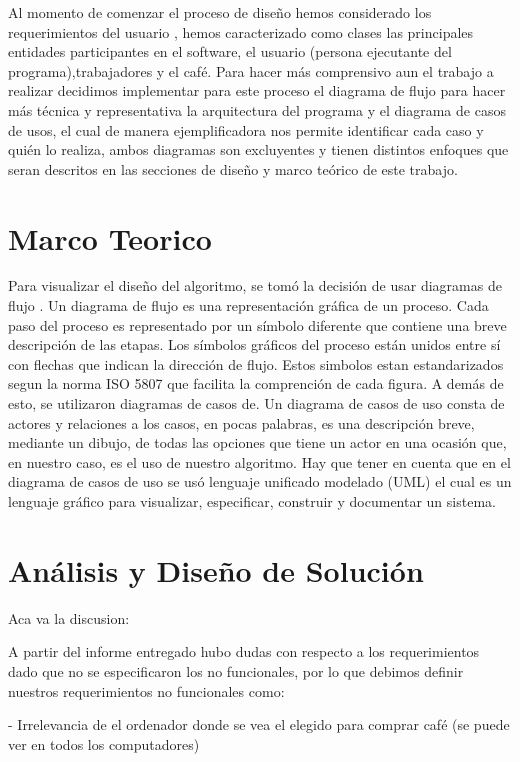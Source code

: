 \documentclass[twocolumn,11pts]{IEEEtran}
\begin{document}
Al momento de comenzar el proceso de diseño hemos considerado los requerimientos del usuario , hemos caracterizado como clases las principales entidades participantes en el software, el usuario (persona ejecutante del programa),trabajadores y el café.
Para hacer más comprensivo aun el trabajo a realizar decidimos implementar para este proceso el diagrama de flujo para hacer más técnica y representativa la arquitectura del programa y el diagrama de casos de usos, el cual de manera ejemplificadora nos permite identificar cada caso y quién lo realiza, ambos diagramas son excluyentes y tienen distintos enfoques que seran descritos en las secciones de diseño y marco teórico de este trabajo.



\section{Marco Teorico}

Para visualizar el diseño del algoritmo, se tomó la decisión de usar diagramas de flujo . Un diagrama de flujo es una representación gráfica de un proceso. Cada paso del proceso es representado por un símbolo diferente que  contiene una breve descripción de las etapas. Los símbolos gráficos del proceso están unidos entre sí con flechas que indican la dirección de flujo. Estos simbolos estan estandarizados segun la norma ISO 5807 que facilita la comprención de cada figura.
A demás de esto, se utilizaron diagramas de casos de. Un diagrama de casos de uso consta de actores y relaciones a los casos, en pocas palabras, es una descripción breve, mediante un dibujo, de todas las opciones que tiene un actor en una ocasión que, en nuestro caso, es el uso de nuestro algoritmo. Hay que tener en cuenta que en el diagrama de casos de uso se usó lenguaje unificado modelado (UML) el cual es un lenguaje gráfico para visualizar, especificar, construir y documentar un sistema.

\section{Análisis y Diseño de Solución}
Aca va la discusion:

A partir del informe entregado hubo dudas con respecto a los requerimientos dado que no se especificaron los no funcionales, por lo que debimos definir nuestros requerimientos no funcionales como: 

- Irrelevancia de el ordenador donde se vea el elegido para comprar café (se puede ver en todos los computadores)
\end{document}
